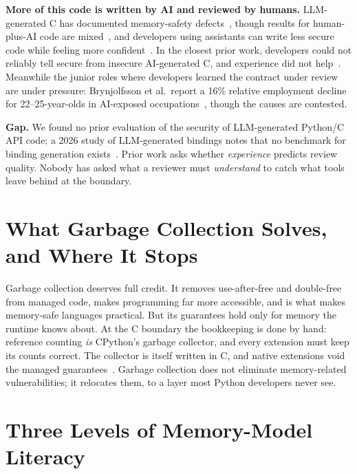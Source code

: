 \documentclass[conference]{IEEEtran}
\begin{document}
\textbf{More of this code is written by AI and reviewed by humans.} LLM-generated C has documented memory-safety defects~\cite{pearce2022}, though results for human-plus-AI code are mixed~\cite{sandoval2023}, and developers using assistants can write less secure code while feeling more confident~\cite{perry2023}. In the closest prior work, developers could not reliably tell secure from insecure AI-generated C, and experience did not help~\cite{khalid2027}. Meanwhile the junior roles where developers learned the contract under review are under pressure: Brynjolfsson et al.\ report a 16\% relative employment decline for 22--25-year-olds in AI-exposed occupations~\cite{brynjolfsson2025}, though the causes are contested.

\textbf{Gap.} We found no prior evaluation of the security of LLM-generated Python/C API code; a 2026 study of LLM-generated bindings notes that no benchmark for binding generation exists~\cite{ompl2026}. Prior work asks whether \emph{experience} predicts review quality. Nobody has asked what a reviewer must \emph{understand} to catch what tools leave behind at the boundary.

\section{What Garbage Collection Solves, and Where It Stops}

Garbage collection deserves full credit. It removes use-after-free and double-free from managed code, makes programming far more accessible, and is what makes memory-safe languages practical. But its guarantees hold only for memory the runtime knows about. At the C boundary the bookkeeping is done by hand: reference counting \emph{is} CPython's garbage collector, and every extension must keep its counts correct. The collector is itself written in C, and native extensions void the managed guarantees~\cite{staicu2023}. Garbage collection does not eliminate memory-related vulnerabilities; it relocates them, to a layer most Python developers never see.

\section{Three Levels of Memory-Model Literacy}
\end{document}
